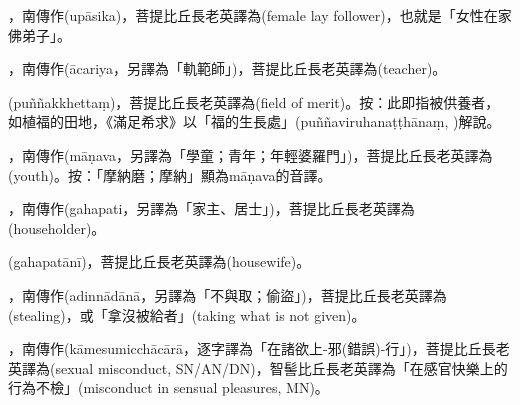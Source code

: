 \startitemgroup[noteitems]
\item{}，南傳作(upāsika)，菩提比丘長老英譯為(female lay follower)，也就是「女性在家佛弟子」。
\stopitemgroup

\startitemgroup[noteitems]
\item{}，南傳作(ācariya，另譯為「軌範師」)，菩提比丘長老英譯為(teacher)。
\stopitemgroup

\startitemgroup[noteitems]
\item{}(puññakkhettaṃ)，菩提比丘長老英譯為(field of merit)。按：此即指被供養者，如植福的田地，《滿足希求》以「福的生長處」(puññaviruhanaṭṭhānaṃ, )解說。
\stopitemgroup

\startitemgroup[noteitems]
\item{}，南傳作(māṇava，另譯為「學童；青年；年輕婆羅門」)，菩提比丘長老英譯為(youth)。按：「摩納磨；摩納」顯為māṇava的音譯。
\stopitemgroup

\startitemgroup[noteitems]
\item{}，南傳作(gahapati，另譯為「家主、居士」)，菩提比丘長老英譯為(householder)。
\item{}(gahapatānī)，菩提比丘長老英譯為(housewife)。
\stopitemgroup

\startitemgroup[noteitems]
\item{}，南傳作(adinnādānā，另譯為「不與取；偷盜」)，菩提比丘長老英譯為(stealing)，或「拿沒被給者」(taking what is not given)。
\stopitemgroup

\startitemgroup[noteitems]
\item{}，南傳作(kāmesumicchācārā，逐字譯為「在諸欲上-邪(錯誤)-行」)，菩提比丘長老英譯為(sexual misconduct, SN/AN/DN)，智髻比丘長老英譯為「在感官快樂上的行為不檢」(misconduct in sensual pleasures, MN)。
\stopitemgroup

